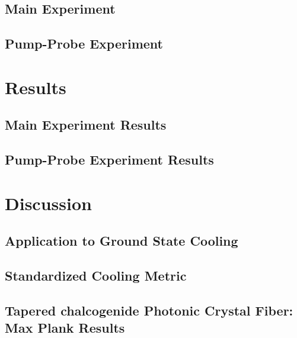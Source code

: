   \subsection{Main Experiment}
  \label{subsec:Cooling:Setup:Main}
  \lipsum[1]

  \subsection{Pump-Probe Experiment}
  \label{subsec:Cooling:Setup:Pump-Probe}
  \lipsum[1]

\section{Results}
\label{sec:Cooling:Results}
\lipsum[1]

  \subsection{Main Experiment Results}
  \label{subsec:Cooling:Results:Main}
  \lipsum[1]

  \subsection{Pump-Probe Experiment Results}
  \label{subsec:Cooling:Results:Pump-Probe}
  \lipsum[1]

\section{Discussion}
\label{sec:Cooling:Discussion}
\lipsum[1]

  \subsection{Application to Ground State Cooling}
  \label{subsec:Cooling:Discussion:Ground-State}
  \lipsum[1]

  \subsection{Standardized Cooling Metric}
  \label{subsec:Cooling:Discussion:Metric}
  \lipsum[1]

  \subsection{Tapered chalcogenide Photonic Crystal Fiber: Max Plank Results}
  \label{subsec:Cooling:Discussion:Max-Plank}
  \lipsum[1]
